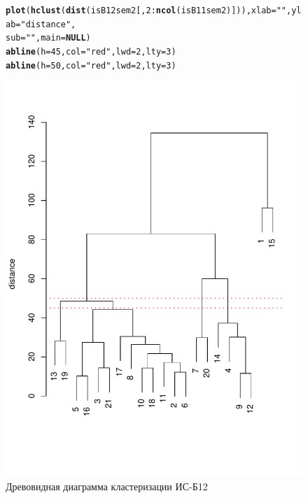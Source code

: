 \documentclass[12pt]{article}\usepackage[]{graphicx}\usepackage[]{color}
\makeatletter
\def\maxwidth{ %
  \ifdim\Gin@nat@width>\linewidth
    \linewidth
  \else
    \Gin@nat@width
  \fi
}
\newcommand{\hlnum}[1]{\textcolor[rgb]{0.686,0.059,0.569}{#1}}%
\newcommand{\hlstr}[1]{\textcolor[rgb]{0.192,0.494,0.8}{#1}}%
\newcommand{\hlopt}[1]{\textcolor[rgb]{0,0,0}{#1}}%
\newcommand{\hlstd}[1]{\textcolor[rgb]{0.345,0.345,0.345}{#1}}%
\newcommand{\hlkwa}[1]{\textcolor[rgb]{0.161,0.373,0.58}{\textbf{#1}}}%
\newcommand{\hlkwc}[1]{\textcolor[rgb]{0.333,0.667,0.333}{#1}}%
\newcommand{\hlkwd}[1]{\textcolor[rgb]{0.737,0.353,0.396}{\textbf{#1}}}%
\newenvironment{kframe}{%
 \def\at@end@of@kframe{}%
 \ifinner\ifhmode%
  \def\at@end@of@kframe{\end{minipage}}%
  \begin{minipage}{\columnwidth}%
 \fi\fi%
 \def\FrameCommand##1{\hskip\@totalleftmargin \hskip-\fboxsep
 \colorbox{shadecolor}{##1}\hskip-\fboxsep
     \hskip-\linewidth \hskip-\@totalleftmargin \hskip\columnwidth}%
 \MakeFramed {\advance\hsize-\width
   \@totalleftmargin\z@ \linewidth\hsize
   \@setminipage}}%
 {\par\unskip\endMakeFramed%
 \at@end@of@kframe}
\newenvironment{knitrout}{}{} %
\makeatother
\begin{document}
\begin{figure}[H]
\centering
\begin{knitrout}
\color{fgcolor}\begin{kframe}
\begin{alltt}
\hlkwd{plot}\hlstd{(}\hlkwd{hclust}\hlstd{(}\hlkwd{dist}\hlstd{(isB12sem2[,} \hlnum{2}\hlopt{:}\hlkwd{ncol}\hlstd{(isB11sem2)])),} \hlkwc{xlab}\hlstd{=}\hlstr{""}\hlstd{,} \hlkwc{ylab}\hlstd{=} \hlstr{"distance"}\hlstd{,}
  \hlkwc{sub}\hlstd{=}\hlstr{""}\hlstd{,} \hlkwc{main}\hlstd{=}\hlkwa{NULL}\hlstd{)}
\hlkwd{abline}\hlstd{(}\hlkwc{h}\hlstd{=}\hlnum{45}\hlstd{,} \hlkwc{col}\hlstd{=}\hlstr{"red"}\hlstd{,} \hlkwc{lwd}\hlstd{=}\hlnum{2}\hlstd{,} \hlkwc{lty}\hlstd{=}\hlnum{3}\hlstd{)}
\hlkwd{abline}\hlstd{(}\hlkwc{h}\hlstd{=}\hlnum{50}\hlstd{,} \hlkwc{col}\hlstd{=}\hlstr{"red"}\hlstd{,} \hlkwc{lwd}\hlstd{=}\hlnum{2}\hlstd{,} \hlkwc{lty}\hlstd{=}\hlnum{3}\hlstd{)}
\end{alltt}
\end{kframe}
\includegraphics[width=\maxwidth]{figure/unnamed-chunk-2-1} 

\end{knitrout}
\caption{Древовидная диаграмма кластеризации ИС-Б12}
\label{fig2}

\end{figure}
\end{document}

